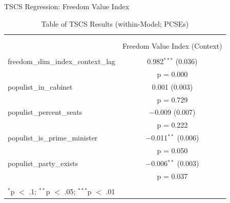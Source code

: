 \documentclass[
  ignorenonframetext,
]{beamer}
\begin{document}
\begin{frame}{TSCS Regression: Freedom Value Index}
\protect\hypertarget{tscs-regression-freedom-value-index}{}

\begin{table}[!htbp] \centering 
  \caption{Table of TSCS Results (within-Model; PCSEs)} 
  \label{} 
\scriptsize 
\begin{tabular}{@{\extracolsep{5pt}}lc} 
\\[-1.8ex]\hline \\[-1.8ex] 
\\[-1.8ex] & Freedom Value Index (Context) \\ 
\hline \\[-1.8ex] 
 freedom\_dim\_index\_context\_lag & 0.982$^{***}$ (0.036) \\ 
  & p = 0.000 \\ 
  populist\_in\_cabinet & 0.001 (0.003) \\ 
  & p = 0.729 \\ 
  populist\_percent\_seats & $-$0.009 (0.007) \\ 
  & p = 0.222 \\ 
  populist\_is\_prime\_minister & $-$0.011$^{**}$ (0.006) \\ 
  & p = 0.050 \\ 
  populist\_party\_exists & $-$0.006$^{**}$ (0.003) \\ 
  & p = 0.037 \\ 
 \hline \\[-1.8ex] 
\multicolumn{2}{l}{$^{*}$p $<$ .1; $^{**}$p $<$ .05; $^{***}$p $<$ .01} \\ 
\end{tabular} 
\end{table}

\end{frame}
\end{document}
